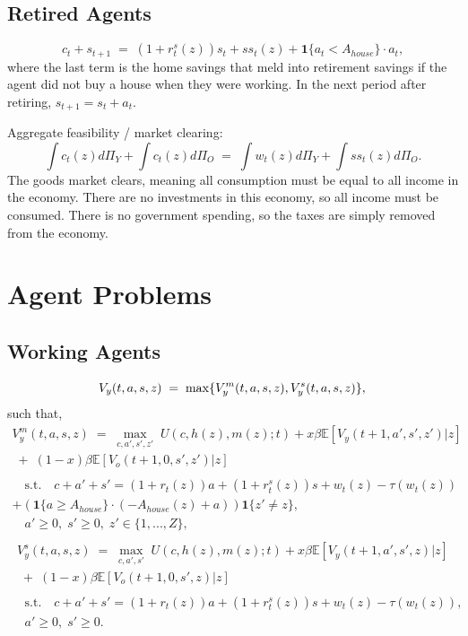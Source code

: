 \documentclass[12pt]{article}
\theoremstyle{remark}
\newcommand{\E}{\mathbb{E}}
\newcommand{\1}{\mathbf{1}}
\begin{document}
\begin{itemize}[leftmargin=1.2em]
\begin{enumerate}
    \subsection{Retired Agents}
      \begin{equation}
        c_t + s_{t+1} \;=\; (1+r^s_t(z))s_t + ss_t(z) + \1\{a_t < A_{house}\} \cdot a_t,
      \end{equation}
          where the last term is the home savings that meld into retirement savings if the agent did not buy a house when they were working. In the next period after retiring, $s_{t+1} = s_t + a_t$.

Aggregate feasibility / market clearing:
\begin{equation}
  \int c_t(z) d\Pi_Y + \int c_t(z) d\Pi_O \;=\; \int w_t(z) d\Pi_Y + \int ss_t(z) d\Pi_O.
\end{equation}
The goods market clears, meaning all consumption must be equal to all income in the economy. There are no investments in this economy, so all income must be consumed.
There is no government spending, so the taxes are simply removed from the economy.

\section{Agent Problems}
\subsection{Working Agents}
\begin{equation}
  V_y(t, a, s, z) \;=\; \max\{V_y^m(t, a, s, z), V_y^s(t, a, s, z)\}, \\
\end{equation}
such that,
\begin{gather*}
  V^m_y(t, a, s, z) \;=\; \max_{c, a', s', z'} \; U(c, h(z), m(z); t) + x\beta \E[V_y(t+1, a', s', z')|z] \\
  \;+\; (1-x)\beta \E[V_o(t+1, 0, s', z')|z] \\
\end{gather*}
\begin{gather*}
  \quad \text{s.t.} \quad c + a' + s' = (1+r_t(z))a + (1+r^s_t(z))s + w_t(z) - \tau(w_t(z)) \\ 
  + (\1\{a \geq A_{house}\} \cdot (-A_{house}(z) + a))\1\{z'\ne z\}, \\
  \quad a' \geq 0, \; s' \geq 0, \; z' \in \{1, ..., Z\}, \\
\end{gather*}
\begin{gather*}
  V^s_y(t, a, s, z) \;=\; \max_{c, a', s'} \; U(c, h(z), m(z); t) + x\beta \E[V_y(t+1, a', s', z)|z] \\
  \;+\; (1-x)\beta \E[V_o(t+1, 0, s', z)|z] \\
\end{gather*}
\begin{gather*}
  \quad \text{s.t.} \quad c + a' + s' = (1+r_t(z))a + (1+r^s_t(z))s + w_t(z) - \tau(w_t(z)), \\
  \quad a' \geq 0, \; s' \geq 0.
\end{gather*}


\end{enumerate}
\end{itemize}
\end{document}
